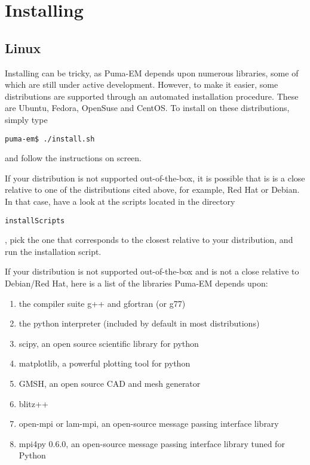 \documentclass[a4paper,10pt]{book}
\begin{document}
\chapter{Installing}

\section{Linux}
%
\par
Installing can be tricky, as Puma-EM depends upon numerous libraries, some of which are still under active development. However, to make it easier, some distributions are supported through an automated installation procedure. These are Ubuntu, Fedora, OpenSuse and CentOS. To install on these distributions, simply type 
\begin{verbatim}
puma-em$ ./install.sh
\end{verbatim}
and follow the instructions on screen.
%
\par
If your distribution is not supported out-of-the-box, it is possible that is is a close relative to one of the distributions cited above, for example, Red Hat or Debian. In that case, have a look at the scripts located in the directory \begin{verbatim}installScripts\end{verbatim}, pick the one that corresponds to the closest relative to your distribution, and run the installation script.

\par
If your distribution is not supported out-of-the-box and is not a close relative to Debian/Red Hat, here is a list of the libraries Puma-EM depends upon:
\begin{enumerate}
\item the compiler suite g++ and gfortran (or g77)
\item the python interpreter (included by default in most distributions)
\item scipy, an open source scientific library for python
\item matplotlib, a powerful plotting tool for python
\item GMSH, an open source CAD and mesh generator
\item blitz++
\item open-mpi or lam-mpi, an open-source message passing interface library
\item mpi4py 0.6.0, an open-source message passing interface library tuned for Python
\end{enumerate}
\end{document}
